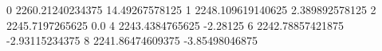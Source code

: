 0 2260.21240234375 14.49267578125
1 2248.109619140625 2.389892578125
2 2245.7197265625 0.0
4 2243.4384765625 -2.28125
6 2242.78857421875 -2.93115234375
8 2241.86474609375 -3.85498046875
